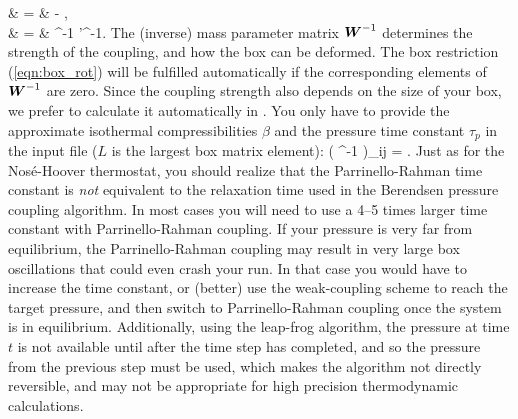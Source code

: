\bea {} & = &  -
  , \\  & = & ^{-1}  '^{-1}.  \eea The (inverse) mass parameter matrix
$\mbox{\boldmath ${W}$}^{-1}$ determines the strength of the coupling, and how the box
can be deformed.  The box restriction (\ref{eqn:box_rot}) will be
fulfilled automatically if the corresponding elements of $\mbox{\boldmath ${W}$}^{-1}$
are zero. Since the coupling strength also depends on the size of your
box, we prefer to calculate it automatically in {\gromacs}.  You only
have to provide the approximate isothermal compressibilities
{\boldmath $\beta$} and the pressure time constant $\tau_p$ in the
input file ($L$ is the largest box matrix element): \beq \left(
^{-1} \right)_{ij} = .
\eeq Just as for the Nos{\'e}-Hoover thermostat, you should realize
that the Parrinello-Rahman time constant is {\em not} equivalent to
the relaxation time used in the Berendsen pressure coupling algorithm.
In most cases you will need to use a 4--5 times larger time constant
with Parrinello-Rahman coupling. If your pressure is very far from
equilibrium, the Parrinello-Rahman coupling may result in very large
box oscillations that could even crash your run.  In that case you
would have to increase the time constant, or (better) use the weak-coupling
scheme to reach the target pressure, and then switch to
Parrinello-Rahman coupling once the system is in equilibrium.
Additionally, using the leap-frog algorithm, the pressure at time $t$
is not available until after the time step has completed, and so the
pressure from the previous step must be used, which makes the algorithm
not directly reversible, and may not be appropriate for high precision
thermodynamic calculations.


